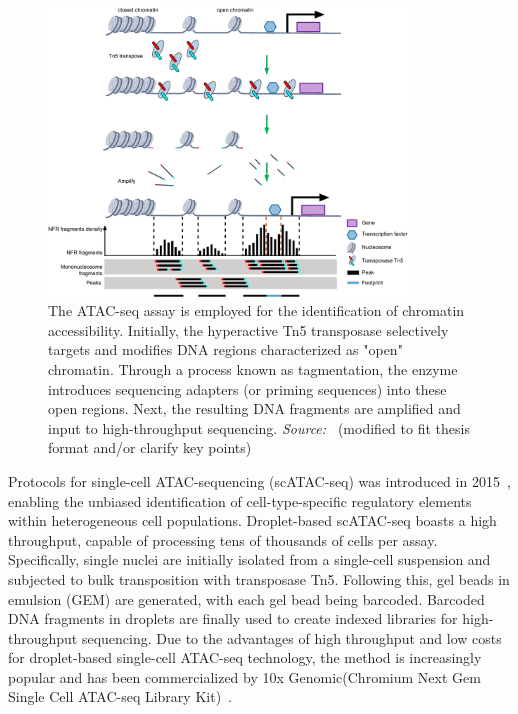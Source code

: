 \begin{figure}[!ht]
	\centering
	\includegraphics[width=0.85\textwidth]{scATAC-seq/fig}
	\vspace{0.1cm}
	\caption[ATAC sequenceing schematic flow.]{The ATAC-seq assay is employed for the identification of chromatin accessibility. Initially, the hyperactive Tn5 transposase selectively targets and modifies DNA regions characterized as "open" chromatin. Through a process known as tagmentation, the enzyme introduces sequencing adapters (or priming sequences) into these open regions. Next, the resulting DNA fragments are amplified and input to high-throughput sequencing. \emph{Source:~\cite{yan2020reads}} (modified to fit thesis format and/or clarify key points)}
	\label{fig:ATAC-seq}
\end{figure}

Protocols for single-cell ATAC-sequencing (scATAC-seq) was introduced in 2015~\citep{Buenrostro2015,cusanovich2015multiplex}, enabling the unbiased identification of cell-type-specific regulatory elements within heterogeneous cell populations. Droplet-based scATAC-seq boasts a high throughput, capable of processing tens of thousands of cells per assay. Specifically, single nuclei are initially isolated from a single-cell suspension and subjected to bulk transposition with transposase Tn5. Following this, gel beads in emulsion (GEM) are generated, with each gel bead being barcoded. Barcoded DNA fragments in droplets are finally used to create indexed libraries for high-throughput sequencing. Due to the advantages of high throughput and low costs for droplet-based single-cell ATAC-seq technology, the method is increasingly popular and has been commercialized by 10x Genomic(Chromium Next Gem Single Cell ATAC-seq Library Kit)~\citep{satpathy2019massively}.



